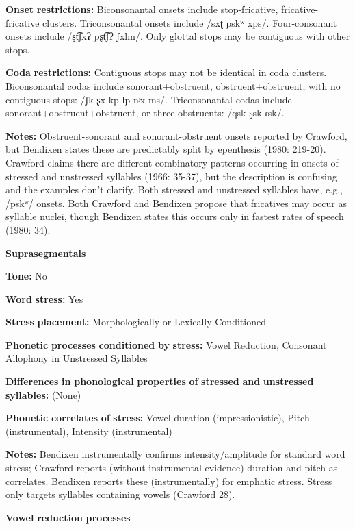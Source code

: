\begin{styleBody}
\textbf{Onset} \textbf{restrictions:} Biconsonantal onsets include stop-fricative, fricative-fricative clusters. Triconsonantal onsets include /sxʈ pskʷ xps/. Four-consonant onsets include /ʂt͡ʃxʔ pʂt͡ʃʔ ʃxlm/. Only glottal stops may be contiguous with other stops.

\textbf{Coda} \textbf{restrictions:} Contiguous stops may not be identical in coda clusters. Biconsonantal codas include sonorant+obstruent, obstruent+obstruent, with no contiguous stops: /ʃk ʂx kp lp nʲx ms/. Triconsonantal codas include sonorant+obstruent+obstruent, or three obstruents: /qsk ʂsk ɾsk/.

\textbf{Notes:} Obstruent-sonorant and sonorant-obstruent onsets reported by Crawford, but Bendixen states these are predictably split by epenthesis (1980: 219-20). Crawford claims there are different combinatory patterns occurring in onsets of stressed and unstressed syllables (1966: 35-37), but the description is confusing and the examples don’t clarify. Both stressed and unstressed syllables have, e.g., /pskʷ/ onsets. Both Crawford and Bendixen propose that fricatives may occur as syllable nuclei, though Bendixen states this occurs only in fastest rates of speech (1980: 34).

\textbf{Suprasegmentals}

\textbf{Tone:} No

\textbf{Word} \textbf{stress:} Yes

\textbf{Stress} \textbf{placement:} Morphologically or Lexically Conditioned

\textbf{Phonetic} \textbf{processes} \textbf{conditioned} \textbf{by} \textbf{stress:} Vowel Reduction, Consonant Allophony in Unstressed Syllables

\textbf{Differences} \textbf{in} \textbf{phonological} \textbf{properties} \textbf{of} \textbf{stressed} \textbf{and} \textbf{unstressed} \textbf{syllables:} (None)

\textbf{Phonetic} \textbf{correlates} \textbf{of} \textbf{stress:} Vowel duration (impressionistic), Pitch (instrumental), Intensity (instrumental)

\textbf{Notes:} Bendixen instrumentally confirms intensity/amplitude for standard word stress; Crawford reports (without instrumental evidence) duration and pitch as correlates. Bendixen reports these (instrumentally) for emphatic stress. Stress only targets syllables containing vowels (Crawford 28).

\textbf{Vowel} \textbf{reduction} \textbf{processes}


\end{styleBody}

